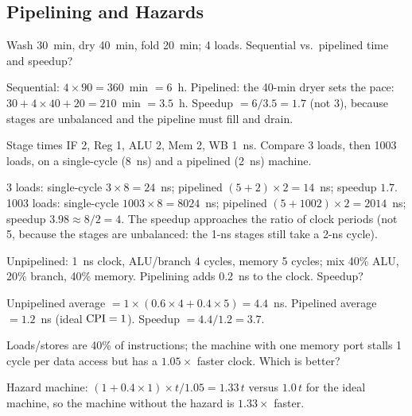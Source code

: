 \subsection{Pipelining and Hazards}

\begin{exercise}[Laundry]
Wash 30~min, dry 40~min, fold 20~min; 4 loads. Sequential vs.\ pipelined
time and speedup?
\end{exercise}
\begin{solution}
Sequential: $4\times90 = 360$~min $=6$~h. Pipelined: the 40-min dryer sets
the pace: $30 + 4\times40 + 20 = 210$~min $=3.5$~h. Speedup $=6/3.5 =
1.7$ (not 3), because stages are unbalanced and the pipeline must fill and
drain.
\end{solution}

\begin{exercise}
Stage times IF 2, Reg 1, ALU 2, Mem 2, WB 1~ns. Compare 3 loads, then 1003
loads, on a single-cycle (8~ns) and a pipelined (2~ns) machine.
\end{exercise}
\begin{solution}
3 loads: single-cycle $3\times8 = 24$~ns; pipelined $(5+2)\times2 = 14$~ns;
speedup $1.7$.
1003 loads: single-cycle $1003\times8 = 8024$~ns; pipelined
$(5+1002)\times2 = 2014$~ns; speedup $3.98 \approx 8/2 = 4$. The speedup
approaches the ratio of clock periods (not 5, because the stages are
unbalanced: the 1-ns stages still take a 2-ns cycle).
\end{solution}

\begin{exercise}
Unpipelined: 1~ns clock, ALU/branch 4 cycles, memory 5 cycles; mix 40\%
ALU, 20\% branch, 40\% memory. Pipelining adds 0.2~ns to the clock.
Speedup?
\end{exercise}
\begin{solution}
Unpipelined average $=1\times(0.6\times4 + 0.4\times5) = 4.4$~ns.
Pipelined average $= 1.2$~ns (ideal $\mathrm{CPI}=1$). Speedup $=4.4/1.2 = 3.7$.
\end{solution}

\begin{exercise}
Loads/stores are 40\% of instructions; the machine with one memory port
stalls 1 cycle per data access but has a $1.05\times$ faster clock. Which is
better?
\end{exercise}
\begin{solution}
Hazard machine: $(1+0.4\times1)\times t/1.05 = 1.33\,t$ versus $1.0\,t$ for
the ideal machine, so the machine without the hazard is $1.33\times$
faster.
\end{solution}

